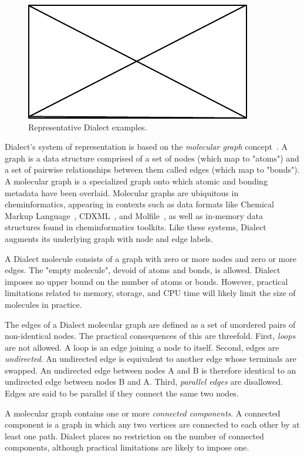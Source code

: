 \documentclass{article}
\begin{document}
\begin{figure}
\centering
\includegraphics{filler}
\caption{Representative Dialect examples.}
\label{fig:myfig}
\end{figure}

Dialect's system of representation is based on the \textit{molecular graph} concept~\cite{balaban:1985}. A graph is a data structure comprised of a set of nodes (which map to "atoms") and a set of pairwise relationships between them called edges (which map to "bonds"). A molecular graph is a specialized graph onto which atomic and bonding metadata have been overlaid. Molecular graphs are ubiquitous in cheminformatics, appearing in contexts such as data formats like Chemical Markup Language~\cite{murray-rust:2011}, CDXML~\cite{cdxml}, and Molfile~\cite{ctfileFormats}, as well as in-memory data structures found in cheminformatics toolkits. Like these systems, Dialect augments its underlying graph with node and edge labels.

A Dialect molecule consists of a graph with zero or more nodes and zero or more edges. The "empty molecule", devoid of atoms and bonds, is allowed. Dialect imposes no upper bound on the number of atoms or bonds. However, practical limitations related to memory, storage, and CPU time will likely limit the size of molecules in practice.

The edges of a Dialect molecular graph are defined as a set of unordered pairs of non-identical nodes. The practical consequences of this are threefold. First, \textit{loops} are not allowed. A loop is an edge joining a node to itself. Second, edges are \textit{undirected}. An undirected edge is equivalent to another edge whose terminals are swapped. An undirected edge between nodes A and B is therefore identical to an undirected edge between nodes B and A. Third, \textit{parallel edges} are disallowed. Edges are said to be parallel if they connect the same two nodes.

A molecular graph contains one or more \textit{connected components}. A connected component is a graph in which any two vertices are connected to each other by at least one path. Dialect places no restriction on the number of connected components, although practical limitations are likely to impose one.
\end{document}
